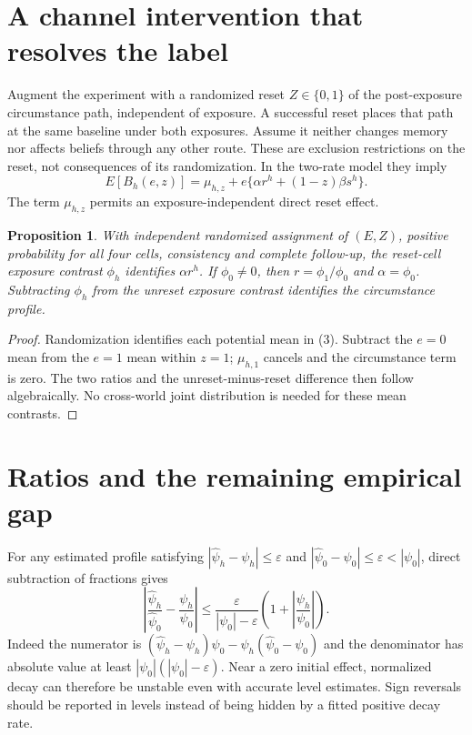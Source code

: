 \documentclass[11pt]{article}
\newtheorem{proposition}[theorem]{Proposition}
\theoremstyle{definition}
\begin{document}
\section*{A channel intervention that resolves the label}
Augment the experiment with a randomized reset $Z\in\{0,1\}$ of the
post-exposure circumstance path, independent of exposure. A successful
reset places that path at the same baseline under both exposures.
Assume it neither changes memory nor affects beliefs through any other
route. These are exclusion restrictions on the reset, not consequences
of its randomization. In the two-rate model they imply
\[
 E[B_h(e,z)]=\mu_{h,z}+e\{\alpha r^h+(1-z)\beta s^h\}.    \tag{3}
\]
The term $\mu_{h,z}$ permits an exposure-independent direct reset effect.

\begin{proposition}
With independent randomized assignment of $(E,Z)$, positive probability
for all four cells, consistency and complete follow-up, the reset-cell
exposure contrast $\phi_h$ identifies $\alpha r^h$. If $\phi_0\ne0$,
then $r=\phi_1/\phi_0$ and $\alpha=\phi_0$. Subtracting $\phi_h$
from the unreset exposure contrast identifies the circumstance profile.
\end{proposition}
\begin{proof}
Randomization identifies each potential mean in (3). Subtract the
$e=0$ mean from the $e=1$ mean within $z=1$; $\mu_{h,1}$ cancels and
the circumstance term is zero. The two ratios and the unreset-minus-reset
difference then follow algebraically. No cross-world joint distribution
is needed for these mean contrasts.
\end{proof}

\section*{Ratios and the remaining empirical gap}
For any estimated profile satisfying
$|\widehat\psi_h-\psi_h|\le\varepsilon$ and
$|\widehat\psi_0-\psi_0|\le\varepsilon<|\psi_0|$,
direct subtraction of fractions gives
\[
 \left|\frac{\widehat\psi_h}{\widehat\psi_0}
            -\frac{\psi_h}{\psi_0}\right|
 \le\frac{\varepsilon}{|\psi_0|-\varepsilon}
       \left(1+\left|\frac{\psi_h}{\psi_0}\right|\right).  \tag{4}
\]
Indeed the numerator is
$(\widehat\psi_h-\psi_h)\psi_0
-\psi_h(\widehat\psi_0-\psi_0)$ and the denominator has absolute
value at least $|\psi_0|(|\psi_0|-\varepsilon)$. Near a zero initial
effect, normalized decay can therefore be unstable even with accurate
level estimates. Sign reversals should be reported in levels instead of
being hidden by a fitted positive decay rate.
\end{document}
